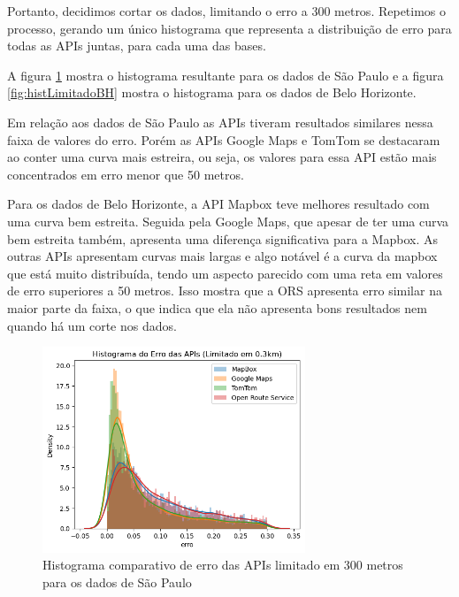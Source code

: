 Portanto, decidimos cortar os dados, limitando o erro a 300 metros. Repetimos o processo, gerando um único histograma que representa a distribuição de erro para todas as APIs juntas, para cada uma das bases. 

A figura \ref{fig:histLimitadoSP} mostra o histograma resultante para os dados de São Paulo e a figura \ref{fig:histLimitadoBH} mostra o histograma para os dados de Belo Horizonte. 

Em relação aos dados de São Paulo as APIs tiveram resultados similares nessa faixa de valores do erro. Porém as APIs Google Maps e TomTom se destacaram ao conter uma curva mais estreira, ou seja, os valores para essa API estão mais concentrados em erro menor que 50 metros. 

Para os dados de Belo Horizonte, a API Mapbox teve melhores resultado com uma curva bem estreita. Seguida pela Google Maps, que apesar de ter uma curva bem estreita também, apresenta uma diferença significativa para a Mapbox. As outras APIs apresentam curvas mais largas e algo notável é a curva da mapbox que está muito distribuída, tendo um aspecto parecido com uma reta em valores de erro superiores a 50 metros. Isso mostra que a ORS apresenta erro similar na maior parte da faixa, o que indica que ela não apresenta bons resultados nem quando há um corte nos dados.

\begin{figure}[h]
  \centering
  \includegraphics[width=0.7\textwidth]{Figuras/histLimitadoSP.png}
  \caption{Histograma comparativo de erro das APIs limitado em 300 metros para os dados de São Paulo}
  \label{fig:histLimitadoSP}
\end{figure}

